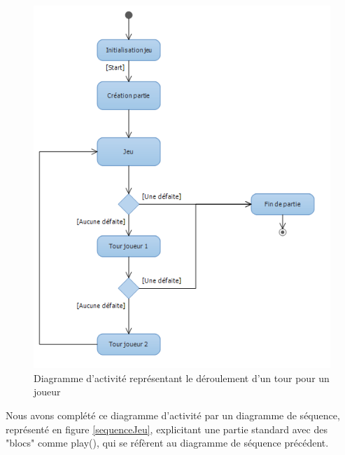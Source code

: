 \begin{figure}[!h] 
\centerline{\includegraphics[scale=0.75]{img/activite_jeu_ex.png}}
   \caption{\label{étiquette} Diagramme d'activité représentant le déroulement d'un tour pour un joueur}
\label{activiteJeu}
\end{figure}

\newpage
Nous avons complété ce diagramme d'activité par un diagramme de séquence, représenté en figure \ref{sequenceJeu}, explicitant une partie standard avec des "blocs" comme play(), qui se réfèrent au diagramme de séquence précédent.  

